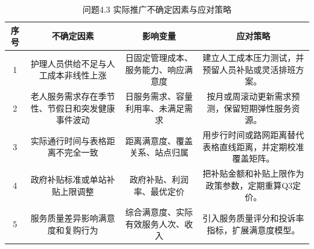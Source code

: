 \begin{table}[htbp]
\centering
\caption{问题4.3 实际推广不确定因素与应对策略}
\begin{tabular}{|c|c|c|c|}
\hline
序号 & 不确定因素 & 影响变量 & 应对策略 \\
\hline
1 & 护理人员供给不足与人工成本非线性上涨 & 日固定管理成本、服务能力、响应满意度 & 建立人工成本压力测试，并预留人员补贴或灵活排班方案。 \\
2 & 老人服务需求存在季节性、节假日和突发健康事件波动 & 日服务需求、容量利用率、未满足需求 & 按月或周滚动更新需求预测，保留短期弹性服务资源。 \\
3 & 实际通行时间与表格距离不完全一致 & 距离满意度、覆盖关系、站点归属 & 用步行时间或路网距离替代表格直线距离，并定期校准覆盖矩阵。 \\
4 & 政府补贴标准或单站补贴上限调整 & 政府补贴、利润率、最优定价 & 把补贴金额和补贴上限作为政策参数，定期重算Q3定价。 \\
5 & 服务质量差异影响满意度和复购行为 & 综合满意度、实际有效服务人次、收入 & 引入服务质量评分和投诉率指标，扩展满意度模型。 \\
\hline
\end{tabular}
\end{table}
